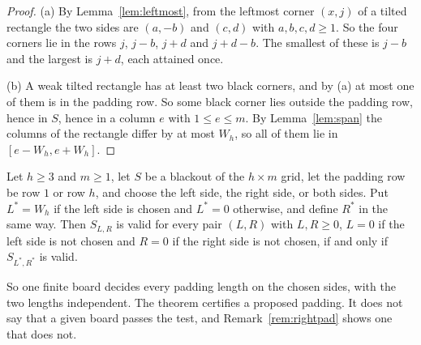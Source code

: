 \begin{proof}
(a) By Lemma~\ref{lem:leftmost}, from the leftmost corner $(x,j)$ of a tilted rectangle the
two sides are $(a,-b)$ and $(c,d)$ with $a,b,c,d\ge1$. So the four corners lie in the rows
$j$, $j-b$, $j+d$ and $j+d-b$. The smallest of these is $j-b$ and the largest is $j+d$, each
attained once.

(b) A weak tilted rectangle has at least two black corners, and by (a) at most one of them is
in the padding row. So some black corner lies outside the padding row, hence in $S$, hence in a
column $e$ with $1\le e\le m$. By Lemma~\ref{lem:span} the columns of the rectangle differ by
at most $W_h$, so all of them lie in $[e-W_h,e+W_h]$.
\end{proof}

\begin{theorem}\label{thm:collar}
Let $h\ge3$ and $m\ge1$, let $S$ be a blackout of the $h\times m$ grid, let the padding row
be row $1$ or row $h$, and choose the left side, the right side, or both sides. Put
$L^*=W_h$ if the left side is chosen and $L^*=0$ otherwise, and define $R^*$ in the same
way. Then $S_{L,R}$ is valid for every pair $(L,R)$ with $L,R\ge0$, $L=0$ if the left side
is not chosen and $R=0$ if the right side is not chosen, if and only if $S_{L^*,R^*}$ is valid.
\end{theorem}

So one finite board decides every padding length on the chosen sides, with the two lengths
independent. The theorem certifies a proposed padding. It does not say that a given board
passes the test, and Remark~\ref{rem:rightpad} shows one that does not.

